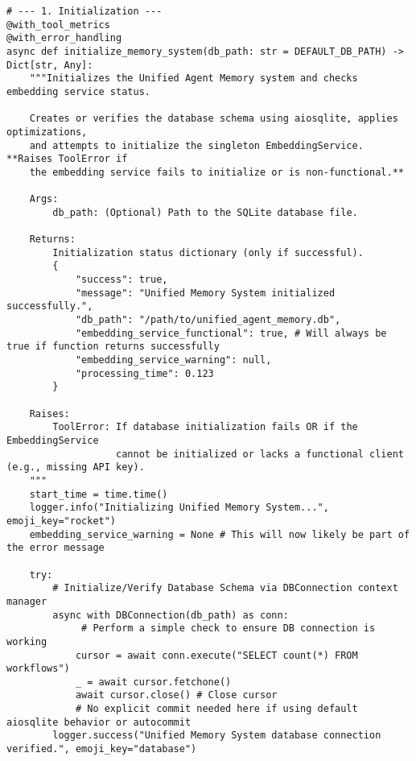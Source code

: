 \documentclass[12pt,a4paper]{article}
\begin{document}
\begin{pageablecode}
\begin{verbatim}
# --- 1. Initialization ---
@with_tool_metrics
@with_error_handling
async def initialize_memory_system(db_path: str = DEFAULT_DB_PATH) -> Dict[str, Any]:
    """Initializes the Unified Agent Memory system and checks embedding service status.

    Creates or verifies the database schema using aiosqlite, applies optimizations,
    and attempts to initialize the singleton EmbeddingService. **Raises ToolError if
    the embedding service fails to initialize or is non-functional.**

    Args:
        db_path: (Optional) Path to the SQLite database file.

    Returns:
        Initialization status dictionary (only if successful).
        {
            "success": true,
            "message": "Unified Memory System initialized successfully.",
            "db_path": "/path/to/unified_agent_memory.db",
            "embedding_service_functional": true, # Will always be true if function returns successfully
            "embedding_service_warning": null,
            "processing_time": 0.123
        }

    Raises:
        ToolError: If database initialization fails OR if the EmbeddingService
                   cannot be initialized or lacks a functional client (e.g., missing API key).
    """
    start_time = time.time()
    logger.info("Initializing Unified Memory System...", emoji_key="rocket")
    embedding_service_warning = None # This will now likely be part of the error message

    try:
        # Initialize/Verify Database Schema via DBConnection context manager
        async with DBConnection(db_path) as conn:
             # Perform a simple check to ensure DB connection is working
            cursor = await conn.execute("SELECT count(*) FROM workflows")
            _ = await cursor.fetchone()
            await cursor.close() # Close cursor
            # No explicit commit needed here if using default aiosqlite behavior or autocommit
        logger.success("Unified Memory System database connection verified.", emoji_key="database")


\end{verbatim}
\end{pageablecode}
\end{document}
